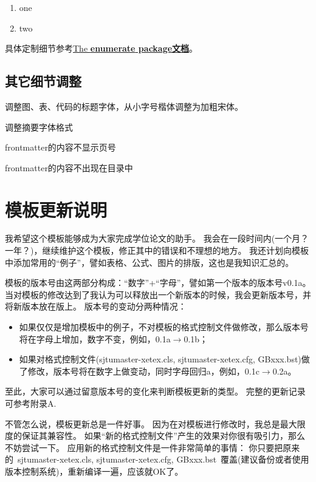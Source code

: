 \begin{enumerate}[{A}-1]
  \item one\label{LC}
  \item two
\end{enumerate}

具体定制细节参考\href{http://www.tug.org/texlive/devsrc/Master/texmf-dist/doc/latex/tools/enumerate.pdf}{The \bf{enumerate} package文档}。

\subsection{其它细节调整}
\label{subsec:bachelor_other}
\begin{enum}
\item 调整图、表、代码的标题字体，从小字号楷体调整为加粗宋体。
\item 调整摘要字体格式
\item frontmatter的内容不显示页号
\item frontmatter的内容不出现在目录中
\end{enum}

\section{模板更新说明}
\label{sec:update}

我希望这个模板能够成为大家完成学位论文的助手。
我会在一段时间内(一个月？一年？)，继续维护这个模板，修正其中的错误和不理想的地方。
我还计划向模板中添加常用的``例子''，譬如表格、公式、图片的排版，这也是我知识汇总的。

模板的版本号由这两部分构成：``数字''+``字母''，譬如第一个版本的版本号v0.1a。
当对模板的修改达到了我认为可以释放出一个新版本的时候，我会更新版本号，并将新版本放在版上。
版本号的变动分两种情况：

\begin{itemize}
\item 如果仅仅是增加模板中的例子，不对模板的格式控制文件做修改，那么版本号将在字母上增加，数字不变，例如，0.1a$\rightarrow$0.1b；
\item 如果对格式控制文件(sjtumaster-xetex.cls, sjtumaster-xetex.cfg, GBxxx.bst)做了修改，版本号将在数字上做变动，同时字母回归a，例如，0.1c$\rightarrow$0.2a。
\end{itemize}

至此，大家可以通过留意版本号的变化来判断模板更新的类型。
完整的更新记录可参考附录A.

不管怎么说，模板更新总是一件好事。
因为在对模板进行修改时，我总是最大限度的保证其兼容性。
如果``新的格式控制文件''产生的效果对你很有吸引力，那么不妨尝试一下。
应用新的格式控制文件是一件非常简单的事情：
你只要把原来的~sjtumaster-xetex.cls, sjtumaster-xetex.cfg, GBxxx.bst~覆盖(建议备份或者使用版本控制系统)，重新编译一遍，应该就OK了。


